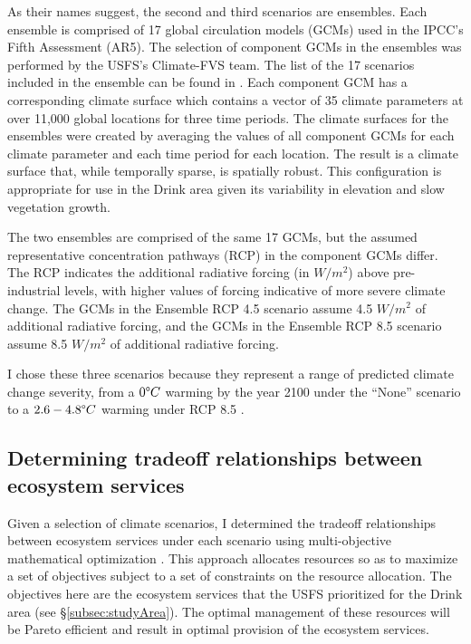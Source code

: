 As their names suggest, the second and third scenarios are ensembles. Each ensemble is comprised of 17 global circulation models (GCMs) used in the IPCC's Fifth Assessment (AR5). The selection of component GCMs in the ensembles was performed by the USFS's Climate-FVS \cite{dixon2002essential} team. The list of the 17 scenarios included in the ensemble can be found in \cite{ClimateModelsInFVSEnsemble}. Each component GCM has a corresponding climate surface which contains a vector of 35 climate parameters at over 11,000 global locations for three time periods. The climate surfaces for the ensembles were created by averaging the values of all component GCMs for each climate parameter and each time period for each location. The result is a climate surface that, while temporally sparse, is spatially robust. This configuration is appropriate for use in the Drink area given its variability in elevation and slow vegetation growth.

The two ensembles are comprised of the same 17 GCMs, but the assumed representative concentration pathways (RCP) in the component GCMs differ. The RCP indicates the additional radiative forcing (in $W/m^2$) above pre-industrial levels, with higher values of forcing indicative of more severe climate change. The GCMs in the Ensemble RCP 4.5 scenario assume 4.5 $W/m^2$ of additional radiative forcing, and the GCMs in the Ensemble RCP 8.5 scenario assume 8.5 $W/m^2$ of additional radiative forcing.

I chose these three scenarios because they represent a range of predicted climate change severity, from a $0 \degree C$ warming by the year 2100 under the ``None'' scenario to a $2.6-4.8 \degree C$ warming under RCP 8.5 \cite{ipcc2013climate}.

\subsection{Determining tradeoff relationships between ecosystem services}
\label{subsec:whyUsingMultiObjModel}
Given a selection of climate scenarios, I determined the tradeoff relationships between ecosystem services under each scenario using multi-objective mathematical optimization \cite{TothFsci2009}. This approach allocates resources so as to maximize a set of objectives subject to a set of constraints on the resource allocation. The objectives here are the ecosystem services that the USFS prioritized for the Drink area (see \S \ref{subsec:studyArea}). The optimal management of these resources will be Pareto efficient and result in optimal provision of the ecosystem services.

